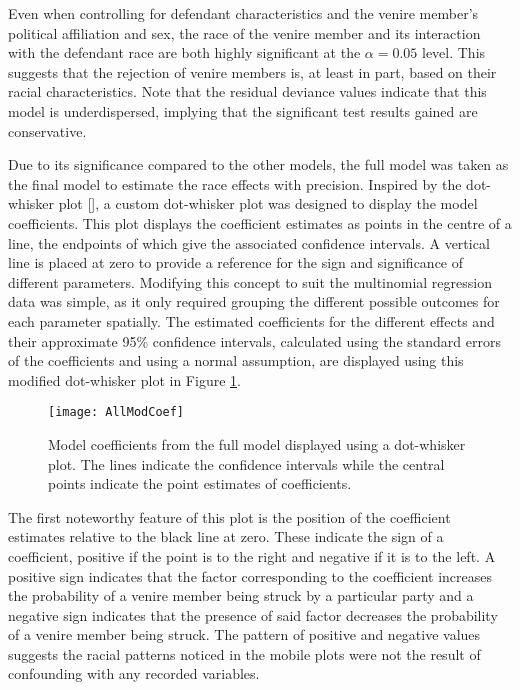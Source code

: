 Even when controlling for defendant characteristics and the venire member's political affiliation and sex, the race of the venire
member and its interaction with the defendant race are both highly significant at the $\alpha = 0.05$ level. This suggests that
the rejection of venire members is, at least in part, based on their racial characteristics. Note that the residual deviance values indicate that this model
is underdispersed, implying that the significant test results gained
are conservative.

Due to its significance compared to the other models, the full model was taken as the final model to estimate the race effects
with precision. Inspired by the dot-whisker plot [\cite{dotwhisker}], a custom dot-whisker plot was designed to display the model coefficients. This plot displays the coefficient estimates as points in the centre of a line, the endpoints of which
give the associated confidence intervals. A vertical line is placed at zero to provide a reference for the sign and significance
of different parameters. Modifying this concept to suit the multinomial regression data was simple, as it only required grouping
the different possible outcomes for each parameter spatially.  The estimated coefficients for the different effects and their approximate 95\% confidence intervals, calculated using the standard errors of the coefficients and using a normal assumption, are displayed using this modified dot-whisker plot in Figure \ref{fig:modallcoef}.

\begin{figure}[h!]
  \centering
  \texttt{[image: AllModCoef]}
  \caption[All Model Coefficients]{\footnotesize Model coefficients from the full model displayed using
    a dot-whisker plot. The lines indicate the confidence intervals while the central points indicate the point estimates of
    coefficients.}
  \label{fig:modallcoef}
\end{figure}


The first noteworthy feature of this plot is the position of the coefficient estimates relative to the black line at zero. These
indicate the sign of a coefficient, positive if the point is to the right and negative if it is to the left. A positive sign
indicates that the factor corresponding to the coefficient increases the probability of a venire member being struck by a particular party and a negative sign indicates that the presence of said factor decreases the
probability of a venire member being struck. The pattern of positive and negative values suggests the racial patterns
noticed in the mobile plots were not the result of confounding with any recorded variables.

